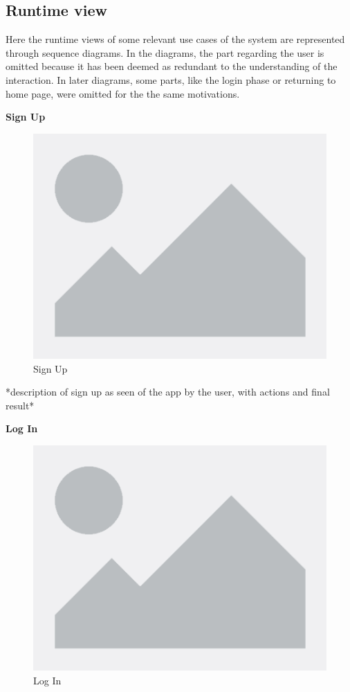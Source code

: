 \documentclass[table, 12pt]{article}
\begin{document}
\subsection{Runtime view}

Here the runtime views of some relevant use cases of the system are represented through sequence diagrams. 
In the diagrams, the part regarding the user is omitted because it has been deemed as redundant to the understanding of the interaction.
In later diagrams, some parts, like the login phase or returning to home page, were omitted for the the same motivations.

\newpage

\textbf{Sign Up}
\begin{center}
    \begin{figure}[H]
        \includegraphics[scale=0.67, center]{assets/placeholder.png}
        \caption{Sign Up}
        \label{fig:signup}
    \end{figure}
\end{center}
*description of sign up as seen of the app by the user, with actions and final result*

\newpage

\textbf{Log In}
\begin{center}
    \begin{figure}[H]
        \includegraphics[scale=0.8, center]{assets/placeholder.png}
        \caption{Log In}
        \label{fig: login}
    \end{figure}
\end{center}
\end{document}
